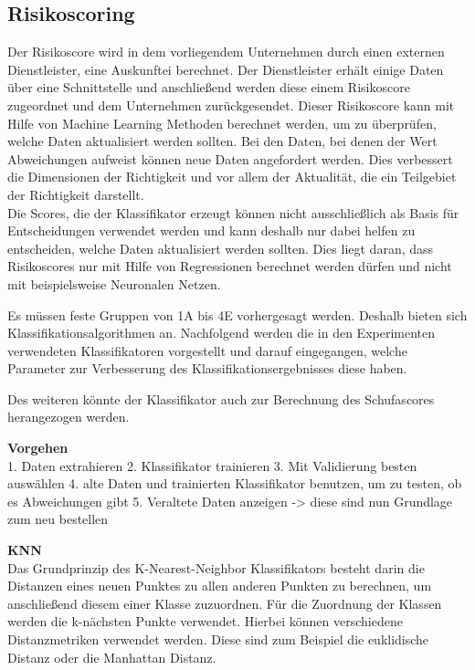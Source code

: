 \subsection{Risikoscoring}
Der Risikoscore wird in dem vorliegendem Unternehmen durch einen externen Dienstleister, eine Auskunftei berechnet. 
Der Dienstleister erhält einige Daten über eine Schnittstelle und anschließend werden diese einem Risikoscore zugeordnet und dem Unternehmen zurückgesendet.
Dieser Risikoscore kann mit Hilfe von Machine Learning Methoden berechnet werden, um zu überprüfen, welche Daten aktualisiert werden sollten.
Bei den Daten, bei denen der Wert Abweichungen aufweist können neue Daten angefordert werden.
Dies verbessert die Dimensionen der Richtigkeit und vor allem der Aktualität, die ein Teilgebiet der Richtigkeit darstellt.
\\
Die Scores, die der Klassifikator erzeugt können nicht ausschließlich als Basis für Entscheidungen verwendet werden und kann deshalb nur dabei helfen zu entscheiden, welche Daten aktualisiert werden sollten.
Dies liegt daran, dass Risikoscores nur mit Hilfe von Regressionen berechnet werden dürfen und nicht mit beispielsweise Neuronalen Netzen.





Es müssen feste Gruppen von 1A bis 4E vorhergesagt werden. Deshalb bieten sich Klassifikationsalgorithmen an.
Nachfolgend werden die in den Experimenten verwendeten Klassifikatoren vorgestellt und darauf eingegangen, welche Parameter zur Verbesserung des Klassifikationsergebnisses diese haben.

Des weiteren könnte der Klassifikator auch zur Berechnung des Schufascores herangezogen werden. 


\textbf{Vorgehen} \\
1. Daten extrahieren
2. Klassifikator trainieren 
3. Mit Validierung besten auswählen
4. alte Daten und trainierten Klassifikator benutzen, um zu testen, ob es Abweichungen gibt
5. Veraltete Daten anzeigen -> diese sind nun Grundlage zum neu bestellen

\textbf{KNN} \\
Das Grundprinzip des K-Nearest-Neighbor Klassifikators besteht darin die Distanzen eines neuen Punktes zu allen anderen Punkten zu berechnen, um anschließend diesem einer Klasse zuzuordnen.
Für die Zuordnung der Klassen werden die k-nächsten Punkte verwendet.
Hierbei können verschiedene Distanzmetriken verwendet werden. 
Diese sind zum Beispiel die euklidische Distanz oder die Manhattan Distanz.



